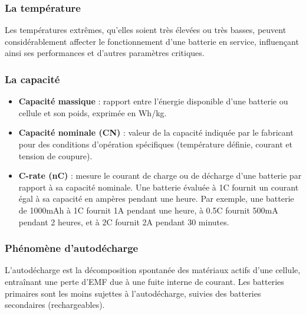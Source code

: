 \subsubsection{La température}

Les températures extrêmes, qu'elles soient très élevées ou très basses, peuvent considérablement affecter le fonctionnement d'une batterie en service, influençant ainsi ses performances et d'autres paramètres critiques.

\subsubsection{La capacité}

\begin{itemize}
	\item \textbf{Capacité massique} : rapport entre l'énergie disponible d'une batterie ou cellule et son poids, exprimée en Wh/kg.
	\item \textbf{Capacité nominale (CN)} : valeur de la capacité indiquée par le fabricant pour des conditions d'opération spécifiques (température définie, courant et tension de coupure).
	\item \textbf{	C-rate (nC)} : mesure le courant de charge ou de décharge d'une batterie par rapport à sa capacité nominale. Une batterie évaluée à 1C fournit un courant égal à sa capacité en ampères pendant une heure. Par exemple, une batterie de 1000mAh à 1C fournit 1A pendant une heure, à 0.5C fournit 500mA pendant 2 heures, et à 2C fournit 2A pendant 30 minutes.
\end{itemize}

\subsubsection{Phénomène d'autodécharge}
L'autodécharge est la décomposition spontanée des matériaux actifs d'une cellule, entraînant une perte d'EMF due à une fuite interne de courant. Les batteries primaires sont les moins sujettes à l'autodécharge, suivies des batteries secondaires (rechargeables).


